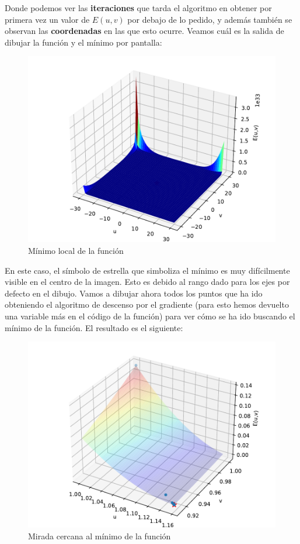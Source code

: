\documentclass[12pt]{scrartcl}
\begin{document}
{Donde podemos ver las \textbf{iteraciones} que tarda el algoritmo en obtener por primera vez un valor de $E(u,v)$ por debajo de lo pedido, y además también
se observan las \textbf{coordenadas} en las que esto ocurre. Veamos cuál es la salida de dibujar la función y el mínimo por pantalla:

\begin{figure}[H]
  \centering
  \includegraphics[scale=0.7]{media/E1-1.pdf}
  \caption{Mínimo local de la función}
\end{figure}

En este caso, el símbolo de estrella que simboliza el mínimo es muy difícilmente visible en el centro de la imagen. Esto es debido al rango dado para los ejes por defecto en el dibujo.
Vamos a dibujar ahora todos los puntos que ha ido obteniendo el algoritmo de descenso por el gradiente (para esto hemos devuelto una variable más en el código de la función) para ver cómo se ha ido buscando 
el mínimo de la función. El resultado es el siguiente:

\begin{figure}[H]
  \centering
  \includegraphics[scale=0.7]{media/E1-1-all.pdf}
  \caption{Mirada cercana al mínimo de la función}
\end{figure}

}
\end{document}
